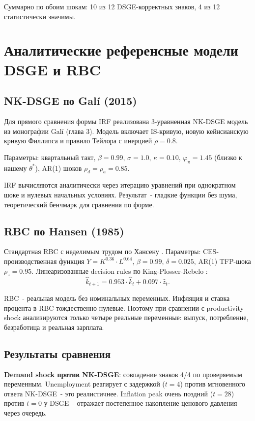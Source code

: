 \documentclass[12pt, a4paper]{article}
\begin{document}
Суммарно по обоим шокам: 10 из 12 DSGE-корректных знаков, 4 из 12 статистически значимы.

\section{Аналитические референсные модели DSGE и RBC}

\subsection{NK-DSGE по Galí (2015)}

Для прямого сравнения формы IRF реализована 3-уравненная NK-DSGE модель из монографии Galí \cite{gali2015} (глава 3). Модель включает IS-кривую, новую кейнсианскую кривую Филлипса и правило Тейлора с инерцией $\rho = 0.8$.

Параметры: квартальный такт, $\beta = 0.99$, $\sigma = 1.0$, $\kappa = 0.10$, $\varphi_{\pi} = 1.45$ (близко к нашему $\theta^*$), AR(1) шоков $\rho_d = \rho_a = 0.85$.

IRF вычисляются аналитически через итерацию уравнений при однократном шоке и нулевых начальных условиях. Результат~- гладкие функции без шума, теоретический бенчмарк для сравнения по форме.

\subsection{RBC по Hansen (1985)}

Стандартная RBC с неделимым трудом по Хансену \cite{hansen1985}. Параметры: CES-производственная функция $Y = K^{0.36} \cdot L^{0.64}$, $\beta = 0.99$, $\delta = 0.025$, AR(1) TFP-шока $\rho_z = 0.95$. Линеаризованные decision rules по King-Plosser-Rebelo \cite{king1988}:
\begin{equation}
\hat{k}_{t+1} = 0.953 \cdot \hat{k}_t + 0.097 \cdot \hat{z}_t.
\end{equation}

RBC~- реальная модель без номинальных переменных. Инфляция и ставка процента в RBC тождественно нулевые. Поэтому при сравнении с productivity shock анализируются только четыре реальные переменные: выпуск, потребление, безработица и реальная зарплата.

\subsection{Результаты сравнения}

\textbf{Demand shock против NK-DSGE}: совпадение знаков 4/4 по проверяемым переменным. Unemployment реагирует с задержкой ($t = 4$) против мгновенного ответа NK-DSGE~- это реалистичнее. Inflation peak очень поздний ($t = 28$) против $t = 0$ у DSGE~- отражает постепенное накопление ценового давления через очередь.
\end{document}
